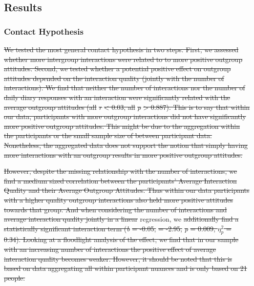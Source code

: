 \documentclass[man, 12pt, a4paper, mask]{apa7} %
\theoremstyle{break}
\theoremstyle{plain}
\providecommand{\DIFaddtex}[1]{{\protect\color{blue}\uwave{#1}}} %
\providecommand{\DIFdeltex}[1]{{\protect\color{red}\sout{#1}}}                      %
\providecommand{\DIFaddbegin}{} %
\providecommand{\DIFaddend}{} %
\providecommand{\DIFdelbegin}{} %
\providecommand{\DIFdelend}{} %
\providecommand{\DIFadd}[1]{\texorpdfstring{\DIFaddtex{#1}}{#1}} %
\providecommand{\DIFdel}[1]{\texorpdfstring{\DIFdeltex{#1}}{}} %
\newcommand{\DIFscaledelfig}{0.5}
\newlength{\DIFdelgraphicswidth} %
\newlength{\DIFdelgraphicsheight} %
\newcommand{\DIFaddincludegraphics}[2][]{{\color{blue}\fbox{\DIFOincludegraphics[#1]{#2}}}} %
\newcommand{\DIFdelincludegraphics}[2][]{%
\sbox{\DIFdelgraphicsbox}{\DIFOincludegraphics[#1]{#2}}%
\settoboxwidth{\DIFdelgraphicswidth}{\DIFdelgraphicsbox} %
\settoboxtotalheight{\DIFdelgraphicsheight}{\DIFdelgraphicsbox} %
\scalebox{\DIFscaledelfig}{%
\parbox[b]{\DIFdelgraphicswidth}{\usebox{\DIFdelgraphicsbox}\\[-\baselineskip] \rule{\DIFdelgraphicswidth}{0em}}\llap{\resizebox{\DIFdelgraphicswidth}{\DIFdelgraphicsheight}{%
\setlength{\unitlength}{\DIFdelgraphicswidth}%
\begin{picture}(1,1)%
\thicklines\linethickness{2pt} %
{\color[rgb]{1,0,0}\put(0,0){\framebox(1,1){}}}%
{\color[rgb]{1,0,0}\put(0,0){\line( 1,1){1}}}%
{\color[rgb]{1,0,0}\put(0,1){\line(1,-1){1}}}%
\end{picture}%
}\hspace*{3pt}}} %
} %
\DeclareRobustCommand{\DIFaddbegin}{\DIFOaddbegin \let\includegraphics\DIFaddincludegraphics} %
\DeclareRobustCommand{\DIFaddend}{\DIFOaddend \let\includegraphics\DIFOincludegraphics} %
\DeclareRobustCommand{\DIFdelbegin}{\DIFOdelbegin \let\includegraphics\DIFdelincludegraphics} %
\DeclareRobustCommand{\DIFdelend}{\DIFOaddend \let\includegraphics\DIFOincludegraphics} %
\begin{document}
\subsection{Results}

\subsubsection{Contact Hypothesis}

\DIFdelbegin \DIFdel{We tested the most general contact hypothesis in two steps. First, we
assessed whether more intergroup interactions were related to to more
positive outgroup attitudes. Second, we tested whether a potential
positive effect on outgroup attitudes depended on the interaction
quality (jointly with the number of interactions). We find that neither
the number of interactions nor the number of daily diary responses with
an interaction were significantly related with the average outgroup
attitudes (all \textbar{} }\textit{\DIFdel{r}} %
\DIFdel{\textbar{} \textless{} 0.03, all
}\textit{\DIFdel{p}} %
\DIFdel{\textgreater{} 0.887). This is to say that within our data,
participants with more outgroup interactions did not have significantly
more positive outgroup attitudes. This might be due to the aggregation
within the participants or the small sample size of between participant
data. Nonetheless, the aggregated data does not support the notion that
simply having more interactions with an outgroup results in more
positive outgroup attitudes.
}%

\DIFdel{However, despite the missing relationship with the number of
interactions, we find a medium sized correlation between the
participants' Average Interaction Quality and their Average Outgroup
Attitudes. Thus within our data participants with a higher quality
outgroup interactions also held more positive attitudes towards that
group. And when considering the number of interactions and average
interaction quality jointly in a linear }\DIFdelend \DIFaddbegin \DIFadd{Using a multilevel }\DIFaddend regression, we \DIFdelbegin \DIFdel{additionally find a statistically significant interaction term (}\textit{\DIFdel{b}} %
\DIFdel{= -0.05,
}%
\DIFdel{= -2.95, }\textit{\DIFdel{p}} %
\DIFdel{= 0.009, \(\eta_p^2\) = 0.34).
Looking at a floodlight analysis of the effect, we find that in our
sample with an increasing number of interactions the positive effect of
average interaction quality becomes weaker. However, it should be noted
that this is based on data aggregating all within participant nuances
and is only based on 21 people.
}%
\end{document}
